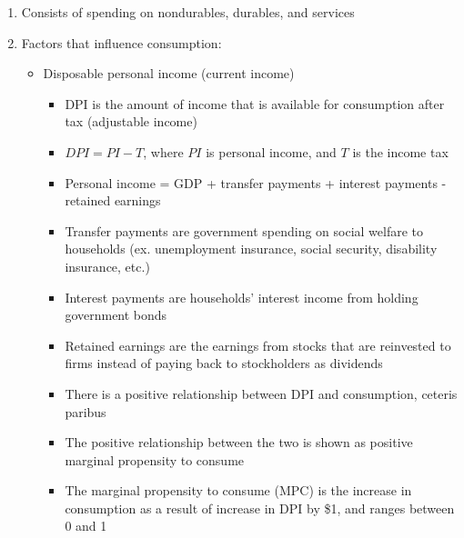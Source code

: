 \documentclass[12pt]{article}
\begin{document}
\begin{enumerate}
\begin{enumerate}
\begin{enumerate}
\begin{enumerate}
                  \item Consists of spending on nondurables, durables, and services

                  \item Factors that influence consumption:

                    \begin{itemize}

                      \item Disposable personal income (current income)

                        \begin{itemize}

                          \item DPI is the amount of income that is available for consumption after tax (adjustable income)

                          \item $DPI = PI - T$, where $PI$ is personal income, and $T$ is the income tax

                          \item Personal income = GDP + transfer payments + interest payments - retained earnings

                          \item Transfer payments are government spending on social welfare to households (ex. unemployment insurance, social security, disability insurance, etc.)

                          \item Interest payments are households' interest income from holding government bonds
                            
                          \item Retained earnings are the earnings from stocks that are reinvested to firms instead of paying back to stockholders as dividends

                          \item There is a positive relationship between DPI and consumption, ceteris paribus

                          \item The positive relationship between the two is shown as positive marginal propensity to consume

                          \item The marginal propensity to consume (MPC) is the increase in consumption as a result of increase in DPI by \$1, and ranges between 0 and 1


\end{itemize}
\end{itemize}
\end{enumerate}
\end{enumerate}
\end{enumerate}
\end{enumerate}
\end{document}
